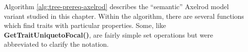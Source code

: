 






Algorithm \ref{alg:tree-prereq-axelrod} describes the ``semantic'' Axelrod model variant studied in this chapter.  Within the algorithm, there are several functions which find traits with particular properties.  Some, like \textbf{GetTraitUniquetoFocal()}, are fairly simple set operations but were abbreviated to clarify the notation. 

